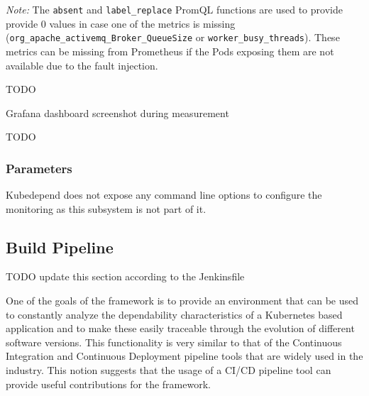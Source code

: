 \emph{Note:} The \texttt{absent} and \texttt{label\_replace} PromQL functions are used to provide provide 0 values in case one of the metrics is missing (\texttt{org\_apache\_activemq\_Broker\_QueueSize} or \texttt{worker\_busy\_threads}). These metrics can be missing from Prometheus if the Pods exposing them are not available due to the fault injection.

TODO

Grafana dashboard screenshot during measurement

TODO


\subsubsection{Parameters}

Kubedepend does not expose any command line options to configure the monitoring as this subsystem is not part of it.

\subsection{Build Pipeline} \label{cicd}

TODO update this section according to the Jenkinsfile


One of the goals of the framework is to provide an environment that can be used to constantly analyze the dependability characteristics of a Kubernetes based application and to make these easily traceable through the evolution of different software versions. This functionality is very similar to that of the Continuous Integration and Continuous Deployment pipeline tools that are widely used in the industry. This notion suggests that the usage of a CI/CD pipeline tool can provide useful contributions for the framework.

